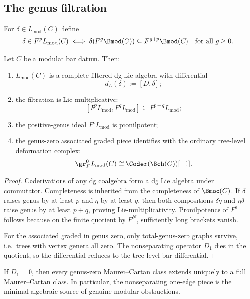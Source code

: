 \subsection{The genus filtration}

\begin{definition}
For $\delta\in L_{\mathrm{mod}}(C)$ define
\[
\delta\in F^pL_{\mathrm{mod}}(C)
\iff
\delta(F^g\Bmod(C))\subseteq F^{g+p}\Bmod(C)
\quad\text{for all }g\ge 0.
\]
\end{definition}

\begin{theorem}\label{thm:formal-structure}
Let $C$ be a modular bar datum. Then:
\begin{enumerate}[leftmargin=2.4em]
\item $L_{\mathrm{mod}}(C)$ is a complete filtered dg Lie algebra with differential
\[
d_L(\delta):=[D,\delta];
\]
\item the filtration is Lie-multiplicative:
\[
[F^pL_{\mathrm{mod}},F^qL_{\mathrm{mod}}]\subseteq F^{p+q}L_{\mathrm{mod}};
\]
\item the positive-genus ideal $F^1L_{\mathrm{mod}}$ is pronilpotent;
\item the genus-zero associated graded piece identifies with the ordinary tree-level deformation complex:
\[
\gr_F^0 L_{\mathrm{mod}}(C)\cong \Coder(\Bch(C))[-1].
\]
\end{enumerate}
\end{theorem}

\begin{proof}
Coderivations of any dg coalgebra form a dg Lie algebra under commutator. Completeness
is inherited from the completeness of $\Bmod(C)$. If $\delta$ raises genus by at least $p$
and $\eta$ by at least $q$, then both compositions $\delta\eta$ and $\eta\delta$ raise genus
by at least $p+q$, proving Lie-multiplicativity. Pronilpotence of $F^1$ follows because on
the finite quotient by $F^N$, sufficiently long brackets vanish.

For the associated graded in genus zero, only total-genus-zero graphs survive, i.e.\ trees
with vertex genera all zero. The nonseparating operator $D_1$ dies in the quotient, so the
differential reduces to the tree-level bar differential.
\end{proof}

\begin{corollary}
If $D_1=0$, then every genus-zero Maurer--Cartan class extends uniquely to a full
Maurer--Cartan class. In particular, the nonseparating one-edge piece is the minimal
algebraic source of genuine modular obstructions.
\end{corollary}


